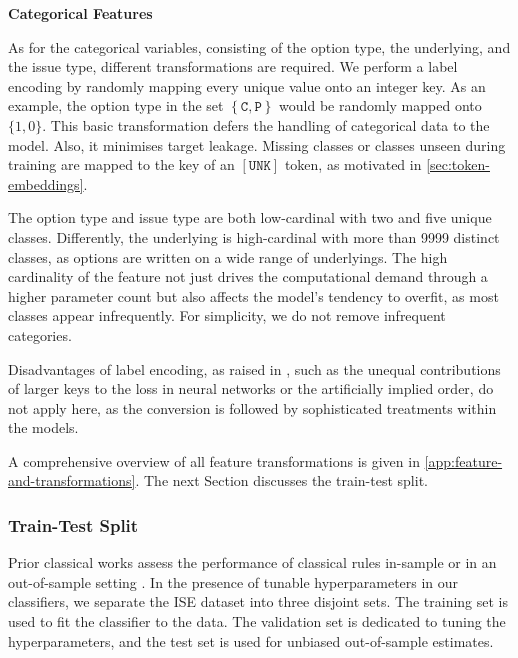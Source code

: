 \textbf{Categorical Features}

As for the categorical variables, consisting of the option type, the underlying, and the issue type, different transformations are required. We perform a label encoding by randomly mapping every unique value onto an integer key. As an example, the option type in the set $\left\{\mathtt{C},\mathtt{P}\right\}$ would be randomly mapped onto $\{1,0\}$. This basic transformation defers the handling of categorical data to the model. Also, it minimises target leakage. Missing classes or classes unseen during training are mapped to the key of an $\mathtt{[UNK]}$ \gls{token}, as motivated in \cref{sec:token-embeddings}.

The option type and issue type are both low-cardinal with two and five unique classes. Differently, the underlying is high-cardinal with more than \num{9999} distinct classes, as options are written on a wide range of underlyings. The high cardinality of the feature not just drives the computational demand through a higher parameter count but also affects the model's tendency to overfit, as most classes appear infrequently. For simplicity, we do not remove infrequent categories.

Disadvantages of label encoding, as raised in \textcite[][12]{hancockSurveyCategoricalData2020}, such as the unequal contributions of larger keys to the loss in neural networks or the artificially implied order, do not apply here, as the conversion is followed by sophisticated treatments within the models.

A comprehensive overview of all feature transformations is given in \cref{app:feature-and-transformations}. The next Section discusses the train-test split.

\subsubsection{Train-Test Split}\label{sec:train-test-split}

Prior classical works assess the performance of classical rules in-sample \autocite[cp.][541]{ellisAccuracyTradeClassification2000} or in an out-of-sample setting \autocites[cp.][7--9]{grauerOptionTradeClassification2022}[][3814--3815]{chakrabartyTradeClassificationAlgorithms2007}. In the presence of tunable hyperparameters in our classifiers, we separate the \gls{ISE} dataset into three disjoint sets. The training set is used to fit the classifier to the data. The validation set is dedicated to tuning the hyperparameters, and the test set is used for unbiased out-of-sample estimates.

